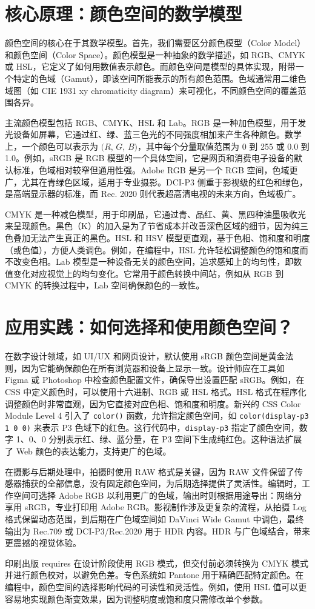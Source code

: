 \chapter{核心原理：颜色空间的数学模型}
颜色空间的核心在于其数学模型。首先，我们需要区分颜色模型（Color Model）和颜色空间（Color Space）。颜色模型是一种抽象的数学描述，如 RGB、CMYK 或 HSL，它定义了如何用数值表示颜色。而颜色空间是模型的具体实现，附带一个特定的色域（Gamut），即该空间所能表示的所有颜色范围。色域通常用二维色域图（如 CIE 1931 xy chromaticity diagram）来可视化，不同颜色空间的覆盖范围各异。\par
主流颜色模型包括 RGB、CMYK、HSL 和 Lab。RGB 是一种加色模型，用于发光设备如屏幕，它通过红、绿、蓝三色光的不同强度相加来产生各种颜色。数学上，一个颜色可以表示为 $(R$, $G$, $B)$，其中每个分量取值范围为 0 到 255 或 0.0 到 1.0。例如，sRGB 是 RGB 模型的一个具体空间，它是网页和消费电子设备的默认标准，色域相对较窄但通用性强。Adobe RGB 是另一个 RGB 空间，色域更广，尤其在青绿色区域，适用于专业摄影。DCI-P3 侧重于影视级的红色和绿色，是高端显示器的标准，而 Rec. 2020 则代表超高清电视的未来方向，色域极广。\par
CMYK 是一种减色模型，用于印刷品，它通过青、品红、黄、黑四种油墨吸收光来呈现颜色。黑色（K）的加入是为了节省成本并改善深色区域的细节，因为纯三色叠加无法产生真正的黑色。HSL 和 HSV 模型更直观，基于色相、饱和度和明度（或色值），方便人类调色。例如，在编程中，HSL 允许轻松调整颜色的饱和度而不改变色相。Lab 模型是一种设备无关的颜色空间，追求感知上的均匀性，即数值变化对应视觉上的均匀变化。它常用于颜色转换中间站，例如从 RGB 到 CMYK 的转换过程中，Lab 空间确保颜色的一致性。\par
\chapter{应用实践：如何选择和使用颜色空间？}
在数字设计领域，如 UI/UX 和网页设计，默认使用 sRGB 颜色空间是黄金法则，因为它能确保颜色在所有浏览器和设备上显示一致。设计师应在工具如 Figma 或 Photoshop 中检查颜色配置文件，确保导出设置匹配 sRGB。例如，在 CSS 中定义颜色时，可以使用十六进制、RGB 或 HSL 格式。HSL 格式在程序化调整颜色时非常直观，因为它直接对应色相、饱和度和明度。新兴的 CSS Color Module Level 4 引入了 \texttt{color()} 函数，允许指定颜色空间，如 \texttt{color(display-p3 1 0 0)} 来表示 P3 色域下的红色。这行代码中，\texttt{display-p3} 指定了颜色空间，数字 1、0、0 分别表示红、绿、蓝分量，在 P3 空间下生成纯红色。这种语法扩展了 Web 颜色的表达能力，支持更广的色域。\par
在摄影与后期处理中，拍摄时使用 RAW 格式是关键，因为 RAW 文件保留了传感器捕获的全部信息，没有固定颜色空间，为后期选择提供了灵活性。编辑时，工作空间可选择 Adobe RGB 以利用更广的色域，输出时则根据用途导出：网络分享用 sRGB，专业打印用 Adobe RGB。影视制作涉及更复杂的流程，从拍摄 Log 格式保留动态范围，到后期在广色域空间如 DaVinci Wide Gamut 中调色，最终输出为 Rec.709 或 DCI-P3/Rec.2020 用于 HDR 内容。HDR 与广色域结合，带来更震撼的视觉体验。\par
印刷出版 requires 在设计阶段使用 RGB 模式，但交付前必须转换为 CMYK 模式并进行颜色校对，以避免色差。专色系统如 Pantone 用于精确匹配特定颜色。在编程中，颜色空间的选择影响代码的可读性和灵活性。例如，使用 HSL 值可以更容易地实现颜色渐变效果，因为调整明度或饱和度只需修改单个参数。\par
